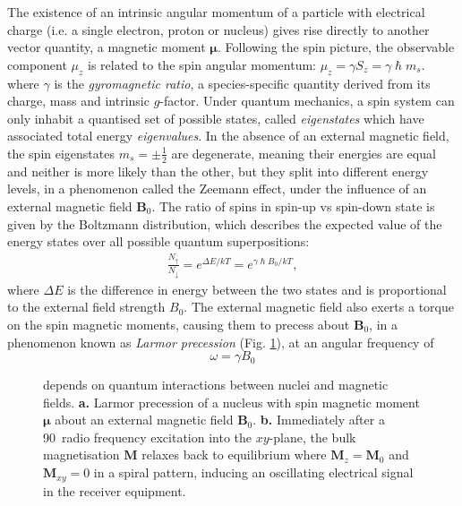 The existence of an intrinsic angular momentum of a particle with electrical charge (i.e. a single electron, proton or nucleus) gives rise directly to another vector quantity, a magnetic moment $\bm{\mu}$.
Following the spin picture, the observable component $\mu_z$ is related to the spin angular momentum: $\mu_z = \gamma S_z = \gamma \hslash m_s $.
where $\gamma$ is the \textit{gyromagnetic ratio}, a species-specific quantity derived from its charge, mass and intrinsic $g$-factor.
Under quantum mechanics, a spin system can only inhabit a quantised set of possible states, called \textit{eigenstates} which have associated total energy \textit{eigenvalues}.
In the absence of an external magnetic field, the spin eigenstates $m_s = \pm \frac{1}{2}$ are degenerate, meaning their energies are equal and neither is more likely than the other, but they split into different energy levels, in a phenomenon called the Zeemann effect, under the influence of an external magnetic field $\mathbf{B}_0$.
The ratio of spins in spin-up vs spin-down state is given by the Boltzmann distribution, which describes the expected value of the energy states over all possible quantum superpositions:
\begin{align}
  \frac{N_{\uparrow}}{N_{\downarrow}} = e^{\Delta E / k T} = e^{\gamma \hslash B_0 / k T}, \label{eq:boltzmann}
\end{align}
where $\Delta E$ is the difference in energy between the two states and is proportional to the external field strength $B_0$.
The external magnetic field also exerts a torque on the spin magnetic moments, causing them to precess about $\mathbf{B}_0$, in a phenomenon known as \textit{Larmor precession} (Fig. \ref{fig:larmor}), at an angular frequency of
\begin{equation}
  \omega = \gamma B_0
\end{equation}

\begin{figure}
    \centering
    \qquad%
    
  \caption[Larmor precession and magnetisation relaxation]{ depends on quantum interactions between nuclei and magnetic fields.
  \textbf{\sffamily a.} Larmor precession of a nucleus with spin magnetic moment $\bm{\mu}$ about an external magnetic field $\mathbf{B}_0$.
  \textbf{\sffamily b.} Immediately after a 90\textdegree\ radio frequency excitation into the $xy$-plane, the bulk magnetisation $\mathbf{M}$ relaxes back to equilibrium where $\mathbf{M}_z=\mathbf{M}_0$ and $\mathbf{M}_{xy}=0$ in a spiral pattern, inducing an oscillating electrical signal in the  receiver equipment.}\label{fig:larmor}
\end{figure}

